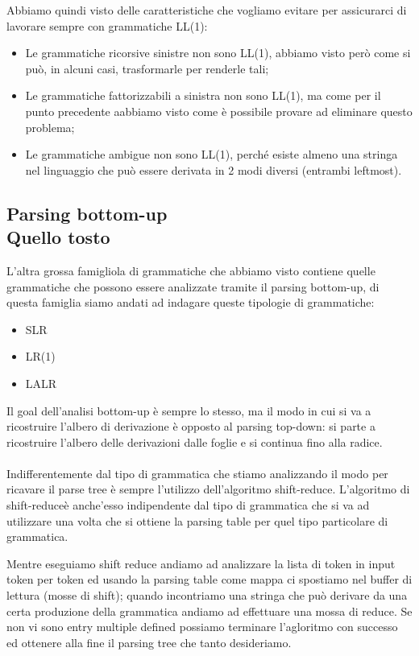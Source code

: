 \documentclass[class=book, crop=false, oneside, 12pt]{standalone}
\begin{document}
Abbiamo quindi visto delle caratteristiche che vogliamo evitare per assicurarci di lavorare sempre con grammatiche LL(1):
\begin{itemize}
    \item Le grammatiche ricorsive sinistre non sono LL(1), abbiamo visto però come si può, in alcuni casi, trasformarle per renderle tali;
    \item Le grammatiche fattorizzabili a sinistra non sono LL(1), ma come per il punto precedente aabbiamo visto come è possibile provare ad eliminare questo problema;
    \item Le grammatiche ambigue non sono LL(1), perché esiste almeno una stringa nel linguaggio che può essere derivata in 2 modi diversi (entrambi leftmost).
\end{itemize}

\subsection{Parsing bottom-up\\ \small{Quello tosto}}
L'altra grossa famigliola di grammatiche che abbiamo visto contiene quelle grammatiche che possono essere analizzate tramite il parsing bottom-up, di questa famiglia siamo andati ad indagare queste tipologie di grammatiche:
\begin{itemize}
    \item SLR
    \item LR(1)
    \item LALR
\end{itemize}
Il goal dell'analisi bottom-up è sempre lo stesso, ma il modo in cui si va a ricostruire l'albero di derivazione è opposto al parsing top-down: si parte a ricostruire l'albero delle derivazioni dalle foglie e si continua fino alla radice.
\\\\
Indifferentemente dal tipo di grammatica che stiamo analizzando il modo per ricavare il parse tree è sempre l'utilizzo dell'algoritmo shift-reduce.
L'algoritmo di shift-reduceè anche'esso indipendente dal tipo di grammatica che si va ad utilizzare una volta che si ottiene la parsing table per quel tipo particolare di grammatica.

Mentre eseguiamo shift reduce andiamo ad analizzare la lista di token in input token per token ed usando la parsing table come mappa ci spostiamo nel buffer di lettura (mosse di shift); quando incontriamo una stringa che può derivare da una certa produzione della grammatica andiamo ad effettuare una mossa di reduce.
Se non vi sono entry multiple defined possiamo terminare l'agloritmo con successo ed ottenere alla fine il parsing tree che tanto desideriamo.
\end{document}
